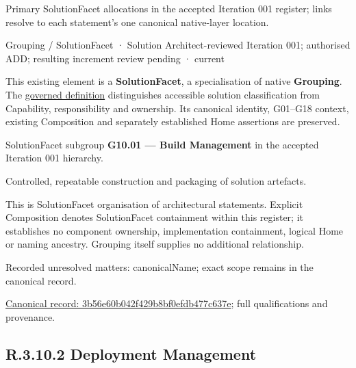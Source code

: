 Primary SolutionFacet allocations in the accepted Iteration 001 register; links resolve to each statement’s one canonical native-layer location.\par
\label{element:3b56e60b042f429b8bf0efdb477c637e}
{\small Grouping / SolutionFacet · Solution Architect-reviewed Iteration 001; authorised ADD; resulting increment review pending · current}\par

This existing element is a \textbf{SolutionFacet}, a specialisation of native
\textbf{Grouping}. The \href{\detokenize{../../../../../../../governance/continuum-representation.md#solutionfacet-classification--1119-candidate}}{governed definition}
distinguishes accessible solution classification from Capability, responsibility
and ownership. Its canonical identity, G01–G18 context, existing Composition
and separately established Home assertions are preserved.



SolutionFacet subgroup \textbf{G10.01 — Build Management} in the accepted Iteration 001 hierarchy.



Controlled, repeatable construction and packaging of solution artefacts.



This is SolutionFacet organisation of architectural statements. Explicit Composition denotes SolutionFacet containment within this register; it establishes no component ownership, implementation containment, logical Home or naming ancestry. Grouping itself supplies no additional relationship.


{\small Recorded unresolved matters: canonicalName; exact scope remains in the canonical record.}\par
{\footnotesize \href{../../../../../../../continuum/grouping/3b56e60b042f429b8bf0efdb477c637e.md}{Canonical record: 3b56e60b042f429b8bf0efdb477c637e}; full qualifications and provenance.}\par
\subsection*{R.3.10.2 Deployment Management}
\label{navigation:R.3.10.2}

